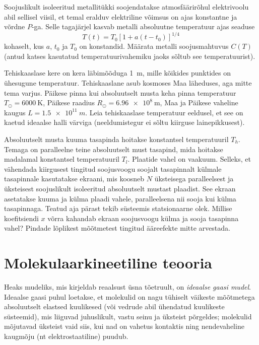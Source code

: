 \documentclass[a4paper,11pt,twocolumn]{article}
\begin{document}
\begin{question}[IPhO 1996, T1]
	Soojuslikult isoleeritud metallitükki soojendatakse atmosfäärirõhul elektrivoolu abil sellisel viisil, et temal eralduv elektriline võimsus on ajas konstantne ja võrdne \( P \)-ga. Selle tagajärjel kasvab metalli absoluutne temperatuur ajas seaduse
	\[ T(t) = T_0[1 + a(t − t_0)]^{1/4} \]
	kohaselt, kus \( a \), \( t_0 \) ja \( T_0 \) on konstandid. Määrata metalli soojusmahtuvus \( C(T) \) (antud katses kasutatud temperatuurivahemiku jaoks sõltub see temperatuurist).
\end{question}
\begin{question}
	Tehiskaaslase kere on kera läbimõõduga \SI{1}{\meter}, mille kõikides punktides on ühesugune temperatuur. Tehiskaaslane asub kosmoses Maa läheduses, aga mitte tema varjus. Päikese pinna kui absoluutselt musta keha pinna temperatuur \( T_\odot = \SI{6000}{\kelvin} \), Päikese raadius \( R_\odot = \SI{6,96e8}{\meter} \), Maa ja Päikese vaheline kaugus \( L = \SI{1,5e11}{m} \). Leia tehiskaaslase temperatuur eeldusel, et see on kaetud ideaalse halli värviga (neeldumistegur ei sõltu kiirguse lainepikkusest).
\end{question}
\begin{question}[IPhO 1996, T1]
	Absoluutselt musta kuuma tasapinda hoitakse konstantsel temperatuuril \( T_h \). Temaga on paralleelne teine absoluutselt must tasapind, mida hoitakse madalamal konstantsel temperatuuril \( T_l \). Plaatide vahel on vaakuum. Selleks, et vähendada kiirgusest tingitud soojusvoogu soojalt tasapinnalt külmale tasapinnale kasutatakse ekraani, mis koosneb \( N \) üksteisega paralleelsest ja üksteisest soojuslikult isoleeritud absoluutselt mustast plaadist. See ekraan asetatakse kuuma ja külma plaadi vahele, paralleelsena nii sooja kui külma tasapinnaga. Teatud aja pärast tekib süsteemis statsionaarne olek. Millise koefitsiendi \( x \) võrra kahandab ekraan soojusvoogu külma ja sooja tasapinna vahel? Pindade lõplikest mõõtmetest
	tingitud ääreefekte mitte arvestada.
\end{question}

\section{Molekulaarkineetiline teooria}
Heaks mudeliks, mis kirjeldab reaalsust üsna tõetruult, on \textit{ideaalse gaasi mudel}. Ideaalse gaasi puhul loetakse, et molekulid on nagu tühiselt väikeste mõõtmetega absoluutselt elastsed kuulikesed (või vedrude abil ühendatud kuulikeste süsteemid), mis liiguvad juhuslikult, vastu seinu ja üksteist põrgeldes; molekulid mõjutavad üksteist vaid siis, kui nad on vahetus kontaktis ning nendevaheline kaugmõju (nt elektrostaatiline) puudub.
\end{document}
